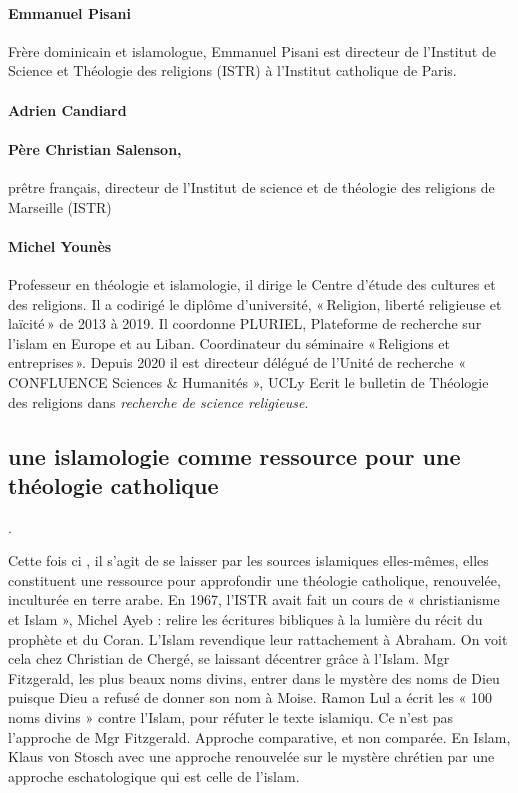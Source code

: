 \paragraph{Emmanuel Pisani}
Frère dominicain et islamologue, Emmanuel Pisani est directeur de l’Institut de Science et Théologie des religions (ISTR) à l’Institut catholique de Paris.

\paragraph{Adrien Candiard}

\paragraph{Père Christian Salenson,} prêtre français, directeur de l’Institut de science et de théologie des religions de Marseille (ISTR)


\paragraph{Michel Younès}
Professeur en théologie et islamologie, il dirige le Centre d’étude des cultures et des religions. Il a codirigé le diplôme d’université, « Religion, liberté religieuse et laïcité » de 2013 à 2019. Il coordonne PLURIEL, Plateforme de recherche sur l’islam en Europe et au Liban. Coordinateur du séminaire « Religions et entreprises ».
Depuis 2020 il est directeur délégué de l’Unité de recherche « CONFLUENCE Sciences \& Humanités », UCLy
Ecrit le bulletin de Théologie des religions dans \textit{recherche de science religieuse}.

\subsection{une islamologie comme ressource pour une théologie catholique} . 

Cette fois ci , il s’agit de se laisser par les sources islamiques elles-mêmes, elles constituent une ressource pour approfondir une théologie catholique, renouvelée, inculturée en terre arabe. En 1967, l’ISTR avait fait un cours de « christianisme et Islam », Michel Ayeb : relire les écritures bibliques à la lumière du récit du prophète et du Coran. L’Islam revendique leur rattachement à Abraham.  On voit cela chez Christian de Chergé, se laissant décentrer grâce à l’Islam. Mgr Fitzgerald, les plus beaux noms divins, entrer dans le mystère des noms de Dieu puisque Dieu a refusé de donner son nom à Moise. Ramon Lul a écrit les « 100 noms divins » contre l’Islam, pour réfuter le texte islamiqu. Ce n’est pas l’approche de Mgr Fitzgerald. Approche comparative, et non comparée. En Islam, Klaus von Stosch  avec une approche renouvelée sur le mystère chrétien par une approche eschatologique qui est celle de l’islam. 

